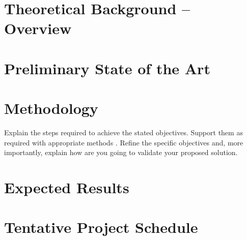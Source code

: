 \documentclass[letterpaper,11pt]{report}
\begin{document}
\chapter{Theoretical Background -- Overview}
\label{cha:TheoreticalBackground}


\chapter{Preliminary State of the Art}
\label{cha:StateOfTheArt}



\chapter{Methodology}
\label{cha:Methodology}

Explain the steps required to achieve the stated objectives. Support them as required with appropriate methods \cite{creswell:2009:scientific-research-book}.
Refine the  specific objectives and, more importantly, explain how are you going to validate your proposed solution.


\chapter{Expected Results}
\label{cha:ExpectedResults}


\chapter{Tentative Project Schedule}
\label{cha:ProjectSchedule}




%



\end{document}
